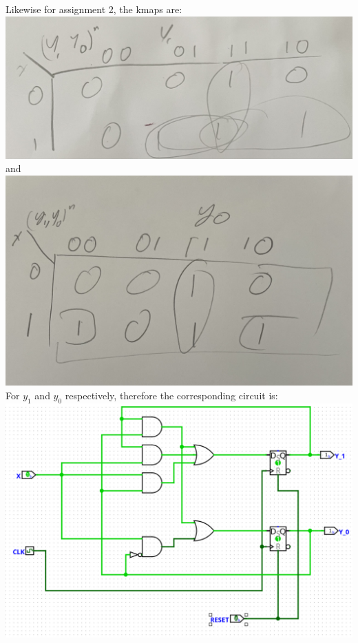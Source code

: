 \documentclass[12pt]{article}
\begin{document}
Likewise for assignment 2, the kmaps are:\\
\includegraphics[scale=0.1]{Q3A2Y1.jpg}\\
and\\
\includegraphics[scale=0.1]{Q3A2Y0.jpg}\\
For $y_1$ and $y_0$ respectively, therefore the corresponding circuit is:\\
\includegraphics[scale=0.3]{Q3circuit2.png}
\end{document}
